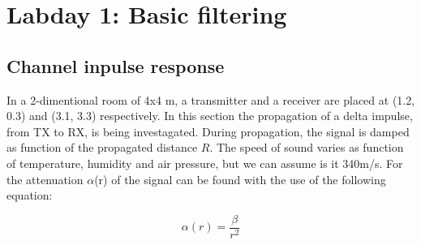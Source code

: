\documentclass[final]{scrreprt} %
\begin{document}
\chapter{Labday 1: Basic filtering}
\label{ch:labday1}
\section{Channel inpulse response}
In a 2-dimentional room of 4x4 m, a transmitter and a receiver are placed at (1.2, 0.3) and (3.1, 3.3) respectively.
In this section the propagation of a delta impulse, from TX to RX, is being investagated.
During propagation, the signal is damped as function of the propagated distance $R$. 
The speed of sound varies as function of temperature, humidity and air pressure, but we can assume is it 340m/s. 
For the attenuation $\alpha$(r) of the signal can be found with the use of the following equation:

\begin{equation}
	\alpha (r) = \frac{\beta}{r^2}
\label{eq:damping}
\end{equation}
\end{document}
